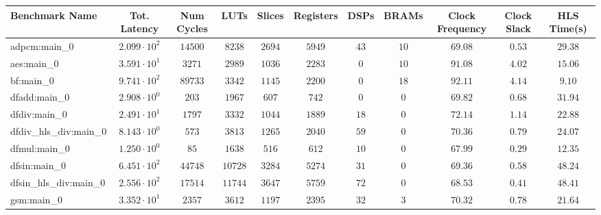 \begin{tabular}{|l|c|c|c|c|c|c|c|c|c|c|}
\hline
Benchmark Name          & Tot. Latency           & Num Cycles & LUTs      & Slices    & Registers & DSPs    & BRAMs   & Clock Frequency & Clock Slack & HLS Time(s) \\
\hline
adpcm:main\_0           & $ 2.099 \cdot 10^{2} $ & $ 14500  $ & $ 8238  $ & $ 2694  $ & $ 5949  $ & $ 43  $ & $ 10  $ & $ 69.08       $ & $ 0.53    $ & $ 29.38   $ \\
aes:main\_0             & $ 3.591 \cdot 10^{1} $ & $ 3271   $ & $ 2989  $ & $ 1036  $ & $ 2283  $ & $ 0   $ & $ 10  $ & $ 91.08       $ & $ 4.02    $ & $ 15.06   $ \\
bf:main\_0              & $ 9.741 \cdot 10^{2} $ & $ 89733  $ & $ 3342  $ & $ 1145  $ & $ 2200  $ & $ 0   $ & $ 18  $ & $ 92.11       $ & $ 4.14    $ & $ 9.10    $ \\
dfadd:main\_0           & $ 2.908 \cdot 10^{0} $ & $ 203    $ & $ 1967  $ & $ 607   $ & $ 742   $ & $ 0   $ & $ 0   $ & $ 69.82       $ & $ 0.68    $ & $ 31.94   $ \\
dfdiv:main\_0           & $ 2.491 \cdot 10^{1} $ & $ 1797   $ & $ 3332  $ & $ 1044  $ & $ 1889  $ & $ 18  $ & $ 0   $ & $ 72.14       $ & $ 1.14    $ & $ 22.88   $ \\
dfdiv\_hls\_div:main\_0 & $ 8.143 \cdot 10^{0} $ & $ 573    $ & $ 3813  $ & $ 1265  $ & $ 2040  $ & $ 59  $ & $ 0   $ & $ 70.36       $ & $ 0.79    $ & $ 24.07   $ \\
dfmul:main\_0           & $ 1.250 \cdot 10^{0} $ & $ 85     $ & $ 1638  $ & $ 516   $ & $ 612   $ & $ 10  $ & $ 0   $ & $ 67.99       $ & $ 0.29    $ & $ 12.35   $ \\
dfsin:main\_0           & $ 6.451 \cdot 10^{2} $ & $ 44748  $ & $ 10728 $ & $ 3284  $ & $ 5274  $ & $ 31  $ & $ 0   $ & $ 69.36       $ & $ 0.58    $ & $ 48.24   $ \\
dfsin\_hls\_div:main\_0 & $ 2.556 \cdot 10^{2} $ & $ 17514  $ & $ 11744 $ & $ 3647  $ & $ 5759  $ & $ 72  $ & $ 0   $ & $ 68.53       $ & $ 0.41    $ & $ 48.41   $ \\
gsm:main\_0             & $ 3.352 \cdot 10^{1} $ & $ 2357   $ & $ 3612  $ & $ 1197  $ & $ 2395  $ & $ 32  $ & $ 3   $ & $ 70.32       $ & $ 0.78    $ & $ 21.64   $ \\

\end{tabular}
